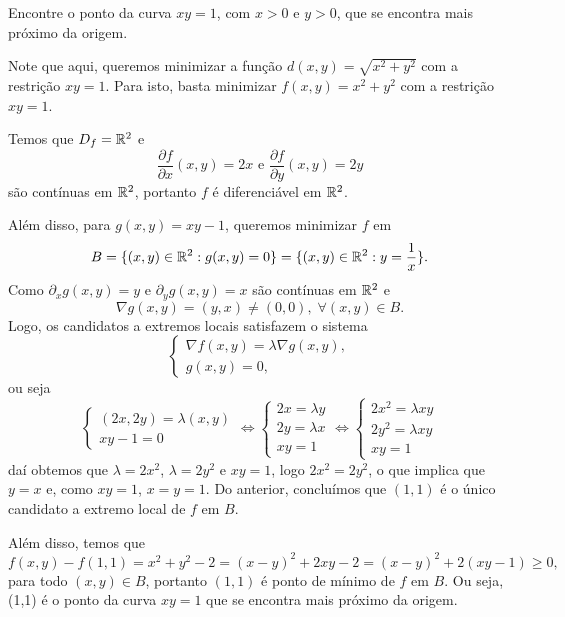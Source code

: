 \begin{example}
    Encontre o ponto da curva \(xy = 1\), com \(x>0\) e \(y>0\), que se encontra mais próximo da origem.

    Note que aqui, queremos minimizar a função \(d(x,y) = \sqrt{x^2 + y^2}\) com a restrição \(xy = 1\). Para isto, basta minimizar \(f(x,y) = x^2 + y^2\) com a restrição \(xy = 1\).

    Temos que \(D_f = \mathbb{R}^2\) e \[\frac{\partial f}{\partial x}(x,y) = 2x \text{ e } \frac{\partial f}{\partial y}(x,y) = 2y\] são contínuas em \(\mathbb{R}^2\), portanto \(f\) é diferenciável em \(\mathbb{R}^2\).

    Além disso, para \(g(x,y) = xy-1\), queremos minimizar \(f\) em \[B = \{(x,y)\in\mathbb{R}^2 : g(x,y) = 0\} = \{(x,y)\in\mathbb{R}^2 : y = \frac{1}{x}\}.\] Como \(\partial_x g(x,y) = y\) e \(\partial_y g(x,y) = x\) são contínuas em \(\mathbb{R}^2\) e \[\nabla g(x,y) = (y,x) \neq (0,0),\; \forall (x,y)\in B.\] Logo, os candidatos a extremos locais satisfazem o sistema \[\begin{cases}
        \nabla f(x,y) = \lambda \nabla g(x,y), \\
        g(x,y) = 0,
    \end{cases}\] ou seja \[\begin{cases}
        (2x,2y) = \lambda (x,y)\\
        xy - 1 = 0
    \end{cases} \Leftrightarrow \begin{cases}
        2x = \lambda y \\
        2y = \lambda x \\
        xy = 1
    \end{cases} \Leftrightarrow \begin{cases}
        2x^2 = \lambda xy \\
        2y^2 = \lambda xy \\
        xy = 1
    \end{cases}\] 
    daí obtemos que \(\lambda = 2x^2\), \(\lambda = 2y^2\) e \(xy=1\), logo \(2x^2 = 2y^2\), o que implica que \(y=x\) e, como \(xy=1\), \(x = y = 1\). Do anterior, concluímos que \((1,1)\) é o único candidato a extremo local de \(f\) em \(B\).

    Além disso, temos que \[ f(x,y) - f(1,1) = x^2 + y^2 - 2 = (x-y)^2 + 2xy - 2 = (x-y)^2 + 2(xy -1) \geq 0,\] para todo \((x,y)\in B\), portanto \((1,1)\) é ponto de mínimo de \(f\) em \(B\). Ou seja, (1,1) é o ponto da curva \(xy=1\) que se encontra mais próximo da origem.
\end{example}

